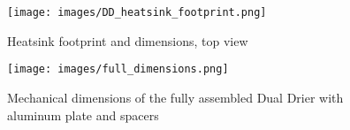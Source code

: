 \begin{figure}
    \centering
    \texttt{[image: images/DD\_heatsink\_footprint.png]}
    \caption{Heatsink footprint and dimensions, top view}
    \label{heatsink_footprints}
\end{figure}

\begin{figure}
    \centering
    \texttt{[image: images/full\_dimensions.png]}
    \caption{Mechanical dimensions of the fully assembled Dual Drier with aluminum plate and spacers}
    \label{full_dimension}
\end{figure}

\newpage



